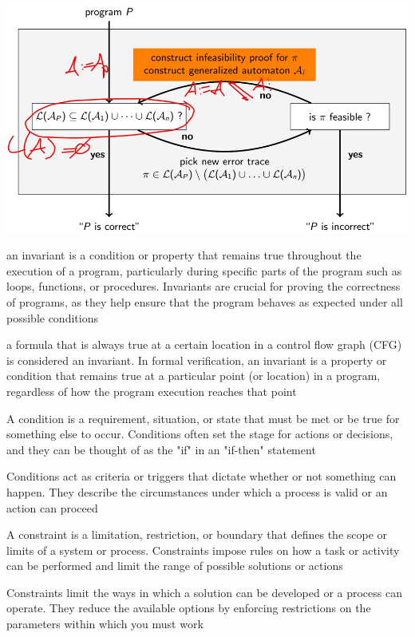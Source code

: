 \documentclass[landscape, a4paper]{article}
\begin{document}
\begin{minipage}[t]{0.2\linewidth}
	\includegraphics[width=\linewidth]{./figures/trace_abstraction_refinement.png}
	\begin{betterlist}
		\item an \alert{invariant} is a condition or property that remains true throughout the execution of a program, particularly during specific parts of the program such as loops, functions, or procedures. Invariants are crucial for proving the correctness of programs, as they help ensure that the program behaves as expected under all possible conditions
		\begin{betterlist}
			\item a formula that is always true at a certain location in a control flow graph (CFG) is considered an invariant. In formal verification, an invariant is a property or condition that remains true at a particular point (or location) in a program, regardless of how the program execution reaches that point
		\end{betterlist}

		\item A \alert{condition} is a requirement, situation, or state that must be met or be true for something else to occur. Conditions often set the stage for actions or decisions, and they can be thought of as the "if" in an "if-then" statement
		\begin{betterlist}
			\item Conditions act as criteria or triggers that dictate whether or not something can happen. They describe the circumstances under which a process is valid or an action can proceed
		\end{betterlist}
		\item A \alert{constraint} is a limitation, restriction, or boundary that defines the scope or limits of a system or process. Constraints impose rules on how a task or activity can be performed and limit the range of possible solutions or actions
		\begin{betterlist}
			\item Constraints limit the ways in which a solution can be developed or a process can operate. They reduce the available options by enforcing restrictions on the parameters within which you must work
		\end{betterlist}


\end{betterlist}
\end{minipage}
\end{document}
